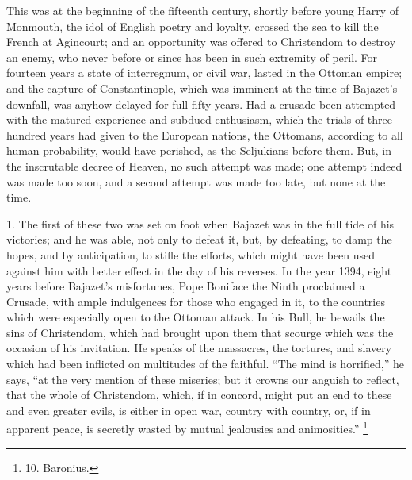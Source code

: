 This was at the beginning of
the fifteenth century, shortly before young Harry of Monmouth, the
idol of English poetry and loyalty, crossed the sea to kill the
French at Agincourt; and an opportunity was offered to Christendom to
destroy an enemy, who never before or since has been in such extremity
of peril. For fourteen years a state of interregnum, or civil war,
lasted in the Ottoman empire; and the capture of Constantinople, which
was imminent at the time of Bajazet's downfall, was anyhow delayed for
full fifty years. Had a crusade been attempted with the matured
experience and subdued enthusiasm, which the trials of three hundred
years had given to the European nations, the Ottomans, according to
all human probability, would have perished, as the Seljukians before
them. But, in the inscrutable decree of Heaven, no such attempt was
made; one attempt indeed was made too soon, and a second attempt was
made too late, but none at the time.

1. The first of these two was
set on foot when Bajazet was in the full tide of his victories; and he
was able, not only to defeat it, but, by defeating, to damp the hopes,
and by anticipation, to stifle the efforts, which might have been used
against him with better effect in the day of his reverses. In the year
1394, eight years before Bajazet's misfortunes, Pope Boniface the
Ninth proclaimed a Crusade, with ample indulgences for those who
engaged in it, to the countries which were especially open to the
Ottoman attack. In his Bull, he bewails the sins of Christendom, which
had brought upon them that scourge which was the occasion of his
invitation. He speaks of the massacres, the tortures, and slavery
which had been inflicted on multitudes of the faithful. ``The mind
is horrified,'' he says, ``at the very mention of these miseries; but it
crowns our anguish to reflect, that the whole of Christendom, which,
if in concord, might put an end to these and even greater evils, is
either in open war, country with country, or, if in apparent
peace, is secretly wasted by mutual jealousies and animosities.'' \footnote{10.
Baronius.}

